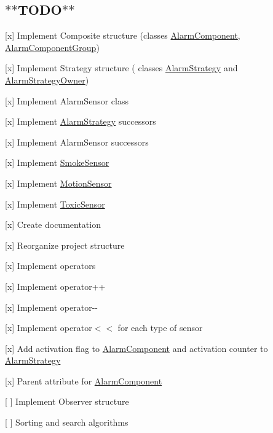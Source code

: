 \subsection*{$\ast$$\ast$\+T\+O\+D\+O$\ast$$\ast$}


\begin{DoxyItemize}
\item \mbox{[}x\mbox{]} Implement Composite structure (classes \hyperlink{classAlarmComponent}{Alarm\+Component}, \hyperlink{classAlarmComponentGroup}{Alarm\+Component\+Group})
\item \mbox{[}x\mbox{]} Implement Strategy structure ( classes \hyperlink{classAlarmStrategy}{Alarm\+Strategy} and \hyperlink{classAlarmStrategyOwner}{Alarm\+Strategy\+Owner})
\item \mbox{[}x\mbox{]} Implement Alarm\+Sensor class
\item \mbox{[}x\mbox{]} Implement \hyperlink{classAlarmStrategy}{Alarm\+Strategy} successors
\item \mbox{[}x\mbox{]} Implement Alarm\+Sensor successors
\begin{DoxyItemize}
\item \mbox{[}x\mbox{]} Implement \hyperlink{classSmokeSensor}{Smoke\+Sensor}
\item \mbox{[}x\mbox{]} Implement \hyperlink{classMotionSensor}{Motion\+Sensor}
\item \mbox{[}x\mbox{]} Implement \hyperlink{classToxicSensor}{Toxic\+Sensor}
\end{DoxyItemize}
\item \mbox{[}x\mbox{]} Create documentation
\item \mbox{[}x\mbox{]} Reorganize project structure
\item \mbox{[}x\mbox{]} Implement operators
\begin{DoxyItemize}
\item \mbox{[}x\mbox{]} Implement operator++
\item \mbox{[}x\mbox{]} Implement operator-\/-\/
\item \mbox{[}x\mbox{]} Implement operator$<$$<$ for each type of sensor
\end{DoxyItemize}
\item \mbox{[}x\mbox{]} Add activation flag to \hyperlink{classAlarmComponent}{Alarm\+Component} and activation counter to \hyperlink{classAlarmStrategy}{Alarm\+Strategy}
\item \mbox{[}x\mbox{]} Parent attribute for \hyperlink{classAlarmComponent}{Alarm\+Component}
\item \mbox{[} \mbox{]} Implement Observer structure
\item \mbox{[} \mbox{]} Sorting and search algorithms 
\end{DoxyItemize}